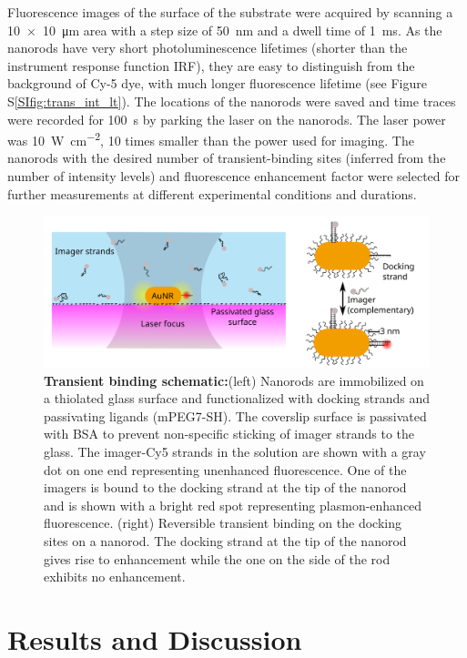Fluorescence images of the surface of the substrate were acquired by scanning a \SI[product-units=power]{10x10}{\um} area with a step size of \SI{50}{\nm} and a dwell time of \SI{1}{\ms}.
As the nanorods have very short photoluminescence lifetimes (shorter than the instrument response function IRF), they are easy to distinguish from the background of Cy-5 dye, with much longer fluorescence lifetime (see Figure S\ref{SIfig:trans_int_lt}).
The locations of the nanorods were saved and time traces were recorded for \SI{100}{\s} by parking the laser on the nanorods.
The laser power was \SI[per-mode=repeated-symbol]{10}{\watt\per\cm\squared}, 10 times smaller than the power used for imaging.
The nanorods with the desired number of transient-binding sites (inferred from the number of intensity levels) and fluorescence enhancement factor were selected for further measurements at different experimental conditions and durations.
\begin{figure}
	\centering
	\includegraphics[width=\linewidth]{scheme}
	\caption{\textbf{Transient binding schematic:}(left) Nanorods are immobilized on a thiolated glass surface and functionalized with docking strands and passivating ligands (mPEG7-SH).
	The coverslip surface is passivated with BSA to prevent non-specific sticking of imager strands to the glass.
	The imager-Cy5 strands in the solution  are shown with a gray dot on one end representing unenhanced fluorescence.
	One of the imagers is bound to the docking strand at the tip of the nanorod and is shown with a bright red spot representing plasmon-enhanced fluorescence.
	(right) Reversible transient binding on the docking sites on a nanorod. The docking strand at the tip of the nanorod gives rise to enhancement while the one on the side of the rod exhibits no enhancement.}
  	\label{sch_trans:setup}
\end{figure}


\section{Results and Discussion}
